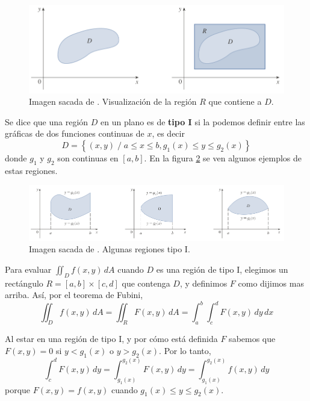 \documentclass[12pt]{article}
\begin{document}
\begin{figure}[H]
  \centering
  \includegraphics[width=\linewidth]{imagenes/integral-region-general.png}
  \caption{Imagen sacada de \parencite{stewart2}. Visualización de la región $ R $ que contiene a $ D $.}
  \label{fig:integral-region-general}
\end{figure}

Se dice que una región $ D $ en un plano es de \textbf{tipo I} si la podemos definir entre las gráficas de dos funciones continuas de $ x $, es decir
\[
  D=\left\{(x,y)  \;/\;  a\leq x\leq b, g_{1}(x)\leq y\leq g_{2}(x)\right\}
\]
donde $ g_{1} $ y $ g_{2} $ son continuas en $ \left[a,b\right] $. En la figura \ref{fig:regiones-tipo-1} se ven algunos ejemplos de estas regiones.

\begin{figure}[H]
  \centering
  \includegraphics[width=\linewidth]{imagenes/regiones-tipo-1.png}
  \caption{Imagen sacada de \parencite{stewart2}. Algunas regiones tipo I.}
  \label{fig:regiones-tipo-1}
\end{figure}

Para evaluar $ \iint_{D} f(x,y) \,dA $ cuando $ D $ es una región de tipo I, elegimos un rectángulo $ R=\left[a,b\right]\times \left[c,d\right] $ que contenga $ D $, y definimos $ F $ como dijimos mas arriba. Así, por el teorema de Fubini,
\[
  \iint_{D} f(x,y) \,dA=\iint_{R} F(x,y) \,dA=\int_{a}^{b} \int_{c}^{d} F(x,y) \,dy\,dx
\]

Al estar en una región de tipo I, y por cómo está definida $ F $ sabemos que $ F(x,y)=0 $ si $ y<g_{1}(x) $ o $ y>g_{2}(x) $. Por lo tanto,
\[
  \int_{c}^{d} F(x,y) \,dy = \int_{g_{1}(x)}^{g_{2}(x)} F(x,y) \,dy=\int_{g_{1}(x)}^{g_{2}(x)} f(x,y) \,dy
\]
porque $ F(x,y)=f(x,y) $ cuando $ g_{1}(x)\leq y\leq g_{2}(x) $.
\end{document}

